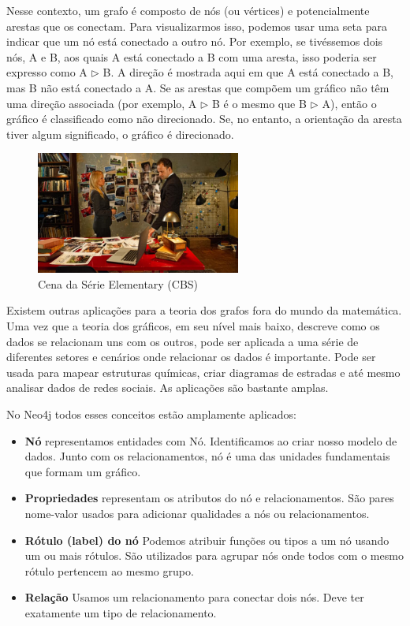 \documentclass[a4paper,11pt]{article}
\begin{document}
Nesse contexto, um grafo é composto de nós (ou vértices) e potencialmente arestas que os conectam. Para visualizarmos isso, podemos usar uma seta para indicar que um nó está conectado a outro nó. Por exemplo, se tivéssemos dois nós, A e B, aos quais A está conectado a B com uma aresta, isso poderia ser expresso como A $\triangleright$ B. A direção é mostrada aqui em que A está conectado a B, mas B não está conectado a A. Se as arestas que compõem um gráfico não têm uma direção associada (por exemplo, A $\triangleright$ B é o mesmo que B $\triangleright$ A), então o gráfico é classificado como não direcionado. Se, no entanto, a orientação da aresta tiver algum significado, o gráfico é direcionado.
\begin{figure}[H]
	\centering
	\includegraphics[width=0.6\textwidth]{imagens/Elementary.jpg}
	\caption{Cena da Série Elementary (CBS)}
\end{figure}

Existem outras aplicações para a teoria dos grafos fora do mundo da matemática. Uma vez que a teoria dos gráficos, em seu nível mais baixo, descreve como os dados se relacionam uns com os outros, pode ser aplicada a uma série de diferentes setores e cenários onde relacionar os dados é importante. Pode ser usada para mapear estruturas químicas, criar diagramas de estradas e até mesmo analisar dados de redes sociais. As aplicações são bastante amplas. 

No Neo4j todos esses conceitos estão amplamente aplicados: \vspace{-1em}
\begin{itemize}
	\item \textbf{Nó} representamos entidades com Nó. Identificamos ao criar nosso modelo de dados. Junto com os relacionamentos, nó é uma das unidades fundamentais que formam um gráfico.
	\item \textbf{Propriedades} representam os atributos do nó e relacionamentos. São pares nome-valor usados para adicionar qualidades a nós ou relacionamentos.
	\item \textbf{Rótulo (label) do nó} Podemos atribuir funções ou tipos a um nó usando um ou mais rótulos. São utilizados para agrupar nós onde todos com o mesmo rótulo pertencem ao mesmo grupo.
	\item \textbf{Relação} Usamos um relacionamento para conectar dois nós. Deve ter exatamente um tipo de relacionamento.
\end{itemize}
	
\end{document}
